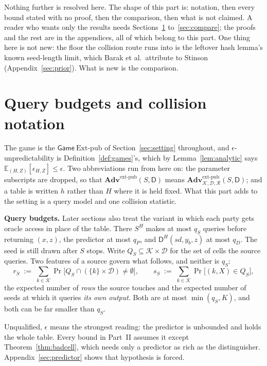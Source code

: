 \documentclass{aicr-solution}
\newcommand{\Adv}{\mathbf{Adv}}
\newcommand{\Gm}{\mathsf{Game}}
\newcommand{\Extp}{\mathrm{Ext}\text{-}\mathrm{pub}}
\newcommand{\extp}{\mathrm{ext}\text{-}\mathrm{pub}}
\newcommand{\sd}{\mathit{sd}}
\newcommand{\calK}{\mathcal{K}}
\newcommand{\calD}{\mathcal{D}}
\newcommand{\calR}{\mathcal{R}}
\begin{document}
Nothing further is resolved here. The shape of this part is: notation, then every bound stated with
no proof, then the comparison, then what is not claimed. A reader who wants only the results needs
Sections~\ref{sec:budgets} to~\ref{sec:compare}; the proofs and the rest are in the appendices, all
of which belong to this part. One thing here is not new: the floor the collision route runs into is
the leftover hash lemma's known seed-length limit, which Barak et al.\ attribute to Stinson
(Appendix~\ref{sec:prior}). What is new is the comparison.

\section{Query budgets and collision notation}\label{sec:budgets}

The game is the $\Gm\ \Extp$ of Section~\ref{sec:setting} throughout, and $\epsilon$-unpredictability
is Definition~\ref{def:games}'s, which by Lemma~\ref{lem:analytic} says
$\mathbb{E}_{(H,Z)}[\epsilon_{H,Z}] \le \epsilon$. Two abbreviations run from here on: the parameter
subscripts are dropped, so that $\Adv^{\extp}(S,\mathsf{D})$ means
$\Adv^{\extp}_{\calK,\calD,\calR}(S,\mathsf{D})$; and a table is written $h$ rather than $H$ where it
is held fixed. What this part adds to the setting is a query model and one collision statistic.

\medskip
\noindent\textbf{Query budgets.} Later sections also treat the variant in which each party gets
oracle access in place of the table. There $S^{H}$ makes at most $q_S$ queries before returning
$(x,z)$, the predictor at most $q_P$, and $\mathsf{D}^{H}(\sd,y_b,z)$ at most $q_D$. The seed is
still drawn after $S$ stops. Write $Q_S \subseteq \calK\times\calD$ for the set of cells the source
queries. Two features of a source govern what follows, and neither is $q_S$:
\begin{equation}\label{eq:rs-ss}
  r_S \;:=\; \sum_{k \in \calK} \Pr\bigl[Q_S \cap (\{k\}\times\calD) \neq \emptyset\bigr] ,
  \qquad
  s_S \;:=\; \sum_{k \in \calK} \Pr\bigl[(k,X) \in Q_S\bigr] ,
\end{equation}
the expected number of \emph{rows} the source touches and the expected number of seeds at which it
queries \emph{its own output}. Both are at most $\min(q_S,K)$, and both can be far smaller than
$q_S$.

Unqualified, $\epsilon$ means the strongest reading: the predictor is unbounded and holds the whole
table. Every bound in Part~II assumes it except Theorem~\ref{thm:badcell}, which needs only a predictor
as rich as the distinguisher. Appendix~\ref{sec:predictor} shows that hypothesis is forced.
\end{document}
